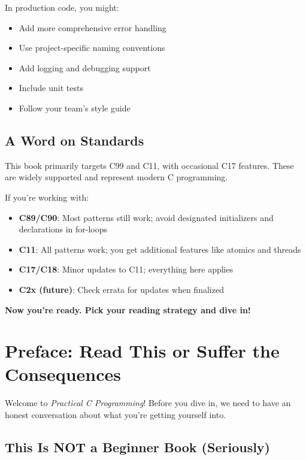 \documentclass[11pt,openany]{book}
\begin{document}
In production code, you might:
\begin{itemize}
    \item Add more comprehensive error handling
    \item Use project-specific naming conventions
    \item Add logging and debugging support
    \item Include unit tests
    \item Follow your team's style guide
\end{itemize}

\section*{A Word on Standards}

This book primarily targets C99 and C11, with occasional C17 features. These are widely supported and represent modern C programming.

If you're working with:
\begin{itemize}
    \item \textbf{C89/C90}: Most patterns still work; avoid designated initializers and declarations in for-loops
    \item \textbf{C11}: All patterns work; you get additional features like atomics and threads
    \item \textbf{C17/C18}: Minor updates to C11; everything here applies
    \item \textbf{C2x (future)}: Check errata for updates when finalized
\end{itemize}

\vspace{2em}

\textbf{Now you're ready. Pick your reading strategy and dive in!}

\clearpage

\chapter{Preface: Read This or Suffer the Consequences}

Welcome to \textit{Practical C Programming}! Before you dive in, we need to have an honest conversation about what you're getting yourself into.

\section*{This Is NOT a Beginner Book (Seriously)}
\end{document}
